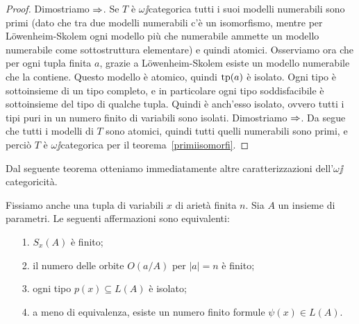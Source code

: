 \begin{proof} 
Dimostriamo $\Rightarrow$. Se $T$ \`e $\omega\jj$categorica  tutti i suoi modelli numerabili sono primi (dato che tra due modelli numerabili c'\`e un isomorfismo, mentre per L\"owenheim-Skolem ogni modello pi\`u che numerabile ammette un modello numerabile come sottostruttura elementare) e quindi atomici. Osserviamo ora che per ogni tupla finita $a$, grazie a L\"owenheim-Skolem esiste un modello numerabile che la contiene. Questo modello \`e atomico, quindi $\textrm{tp}(a)$ \`e isolato. Ogni tipo \`e sottoinsieme di un tipo completo, e in particolare ogni tipo soddisfacibile \`e sottoinsieme del tipo di qualche tupla. Quindi \`e anch'esso isolato, ovvero tutti i tipi puri in un numero finito di variabili sono isolati. Dimostriamo $\Rightarrow$. Da  segue che tutti i modelli di $T$ sono atomici, quindi tutti quelli numerabili sono primi, e perci\`o $T$ \`e $\omega\jj$categorica per il teorema~\ref{primiisomorfi}.
\end{proof}

Dal seguente teorema otteniamo immediatamente altre caratterizzazioni dell'$\omega\jj$catego\-ri\-ci\-t\`a.

\begin{theorem}\label{omegacategoricaequivalenzevarie} Fissiamo anche una tupla di variabili $x$ di ariet\`a finita $n$. Sia $A$ un insieme di parametri. Le seguenti affermazioni sono equivalenti:
\begin{itemize}
\item[1.] $S_x(A)$ \`e finito;
\item[2.] il numero delle orbite $O(a/A)$ per $|a|=n$ \`e finito;
\item[3.] ogni tipo $p(x)\subseteq L(A)$ \`e isolato;
\item[4.] a meno di equivalenza, esiste un numero finito formule $\psi(x)\in L(A)$.
\end{itemize}
\end{theorem}

